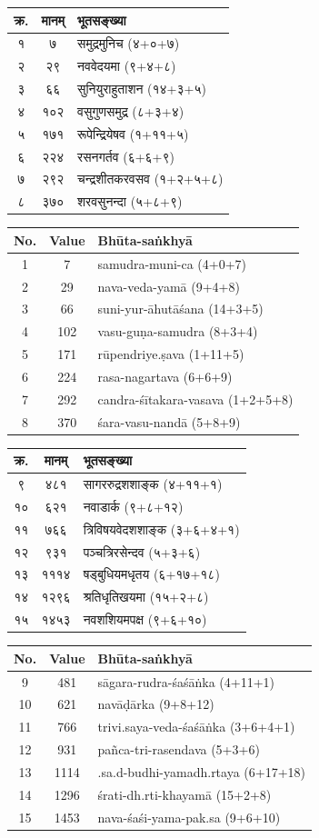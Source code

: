 \documentclass[11pt,a4paper]{book}
\newcommand{\bilingual}[2]{%
  \par\vspace{0.6em}%
  \noindent\begin{minipage}[t]{0.48\textwidth}
    \RaggedRight
    #1%
  \end{minipage}%
  \hfill
  \begin{minipage}[t]{0.48\textwidth}
    \RaggedRight
    #2%
  \end{minipage}%
  \par\vspace{0.6em}%
}
\begin{document}
\bilingual{%
\begin{tabular}{|c|c|l|}
\hline
क्र. & मानम्‌ & भूतसङ्ख्या \\
\hline
१ & ७ & समुद्रमुनिच (४+०+७) \\
२ & २९ & नववेदयमा (९+४+८) \\
३ & ६६ & सुनियुराहुताशन (१४+३+५) \\
४ & १०२ & वसुगुणसमुद्र (८+३+४) \\
५ & १७१ & रूपेन्द्रियेषव (१+११+५) \\
६ & २२४ & रसनगर्तव (६+६+९) \\
७ & २९२ & चन्द्रशीतकरवसव (१+२+५+८) \\
८ & ३७० & शरवसुनन्दा (५+८+९) \\
\hline
\end{tabular}
}{%
\begin{tabular}{|c|c|l|}
\hline
No. & Value & Bhūta-saṅkhyā \\
\hline
1 & 7 & samudra-muni-ca (4+0+7) \\
2 & 29 & nava-veda-yamā (9+4+8) \\
3 & 66 & suni-yur-āhutāśana (14+3+5) \\
4 & 102 & vasu-guṇa-samudra (8+3+4) \\
5 & 171 & rūpendriye.ṣava (1+11+5) \\
6 & 224 & rasa-nagartava (6+6+9) \\
7 & 292 & candra-śītakara-vasava (1+2+5+8) \\
8 & 370 & śara-vasu-nandā (5+8+9) \\
\hline
\end{tabular}
}

\bilingual{%
\begin{tabular}{|c|c|l|}
\hline
क्र. & मानम्‌ & भूतसङ्ख्या \\
\hline
९ & ४८१ & सागररुद्रशशाङ्क (४+११+१) \\
१० & ६२१ & नवाडार्क (९+८+१२) \\
११ & ७६६ & त्रिविषयवेदशशाङ्क (३+६+४+१) \\
१२ & ९३१ & पञ्चत्रिरसेन्दव (५+३+६) \\
१३ & १११४ & षड्बुधियमधृतय (६+१७+१८) \\
१४ & १२९६ & श्रतिधृतिखयमा (१५+२+८) \\
१५ & १४५३ & नवशशियमपक्ष (९+६+१०) \\
\hline
\end{tabular}
}{%
\begin{tabular}{|c|c|l|}
\hline
No. & Value & Bhūta-saṅkhyā \\
\hline
9 & 481 & sāgara-rudra-śaśāṅka (4+11+1) \\
10 & 621 & navāḍārka (9+8+12) \\
11 & 766 & trivi.saya-veda-śaśāṅka (3+6+4+1) \\
12 & 931 & pañca-tri-rasendava (5+3+6) \\
13 & 1114 & .sa.d-budhi-yamadh.rtaya (6+17+18) \\
14 & 1296 & śrati-dh.rti-khayamā (15+2+8) \\
15 & 1453 & nava-śaśi-yama-pak.sa (9+6+10) \\
\hline
\end{tabular}
}
\end{document}
